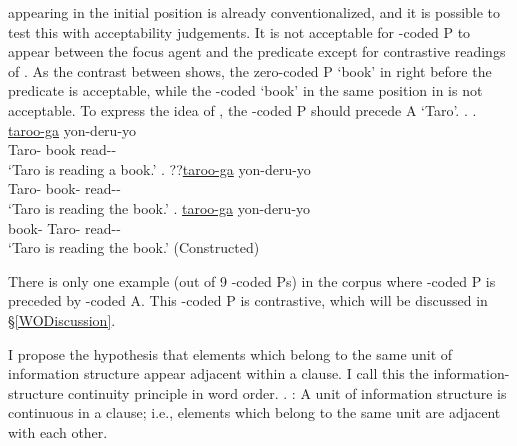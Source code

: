  appearing in the initial position is already conventionalized, and
it is possible to test this with acceptability judgements.
It is not acceptable for -coded P to appear between the focus agent and the predicate except for contrastive readings of .
As the contrast between \Next[a-c] shows,
the zero-coded P  `book' in \Next[a] right before the predicate is acceptable,
while the -coded  `book' in the same position in \Next[b] is not acceptable.
To express the idea of \Next[b],
the -coded P should precede A  `Taro'.
%
\ex. \ag. \ul{taroo-ga}  yon-deru-yo \\
		Taro- book read-- \\
		`Taro is reading a book.'
	\bg. ??\ul{taroo-ga}  yon-deru-yo \\
		Taro- book- read-- \\
		`Taro is reading the book.'
	\bg.  \ul{taroo-ga} yon-deru-yo \\
		book- Taro- read-- \\
		`Taro is reading the book.'
		\hfill{(Constructed)}

There is only one example (out of 9 -coded Ps) in the corpus
where -coded P is preceded by -coded A.
This -coded P is contrastive, which will be discussed in \S \ref{WODiscussion}.

I propose the hypothesis that elements which belong to the same unit of information structure appear adjacent within a clause.
I call this the information-structure continuity principle in word order.
%
\ex. \label{IScontinuityP}:
 A unit of information structure is continuous in a clause;
 i.e., elements which belong to the same unit are adjacent with each other.

